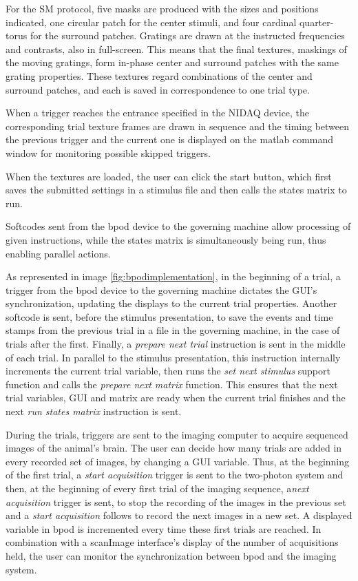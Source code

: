 For the SM protocol, five masks are produced with the sizes and positions indicated, one circular patch for the center stimuli, and four cardinal quarter-torus for the surround patches. Gratings are drawn at the instructed frequencies and contrasts, also in full-screen. This means that the final textures, maskings of the moving gratings, form in-phase center and surround patches with the same grating properties. These textures regard combinations of the center and surround patches, and each is saved in correspondence to one trial type.

When a trigger reaches the entrance specified in the NIDAQ device, the corresponding trial texture frames are drawn in sequence and the timing between the previous trigger and the current one is displayed on the matlab command window for monitoring possible skipped triggers.

When the textures are loaded, the user can click the start button, which first saves the submitted settings in a stimulus file and then calls the states matrix to run.

Softcodes sent from the bpod device to the governing machine allow processing of given instructions, while the states matrix is simultaneously being run, thus enabling parallel actions. 

As represented in image \ref{fig:bpodimplementation}, in the beginning of a trial, a trigger from the bpod device to the governing machine dictates the GUI's synchronization, updating the displays to the current trial properties. Another softcode is sent, before the stimulus presentation, to save the events and time stamps from the previous trial in a file in the governing machine, in the case of trials after the first. Finally, a \textit{prepare next trial} instruction is sent in the middle of each trial. In parallel to the stimulus presentation, this instruction internally increments the current trial variable, then runs the \textit{set next stimulus} support function and calls the \textit{prepare next matrix} function. This ensures that the next trial variables, GUI and matrix are ready when the current trial finishes and the next \textit{run states matrix} instruction is sent.

During the trials, triggers are sent to the imaging computer to acquire  sequenced images of the animal's brain. The user can decide how many trials are added in every recorded set of images, by changing a GUI variable. Thus, at the beginning of the first trial, a \textit{start acquisition} trigger is sent to the two-photon system and then, at the beginning of every first trial of the imaging sequence, a\textit{next acquisition} trigger is sent, to stop the recording of the images in the previous set and a \textit{start acquisition} follows to record the next images in a new set. A displayed variable in bpod is incremented every time these first trials are reached. In combination with a scanImage interface's display of the number of acquisitions held, the user can monitor the synchronization between bpod and the imaging system.

